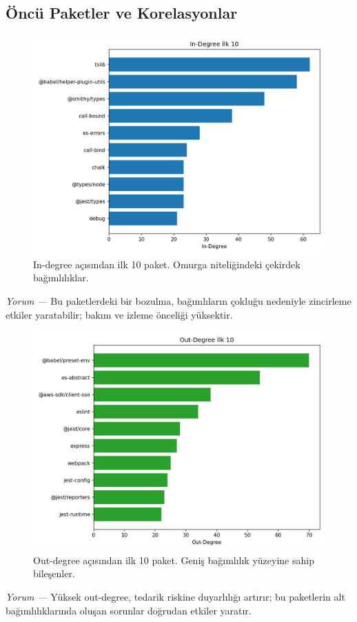 \documentclass[11pt,a4paper]{article}
\begin{document}
\subsection{Öncü Paketler ve Korelasyonlar}
\begin{figure}[H]
  \centering
  \includegraphics{top10_in_degree.png}
  \caption{In-degree açısından ilk 10 paket. Omurga niteliğindeki çekirdek bağımlılıklar.}
\end{figure}
\textit{Yorum —} Bu paketlerdeki bir bozulma, bağımlıların çokluğu nedeniyle zincirleme etkiler yaratabilir; bakım ve izleme önceliği yüksektir.

\begin{figure}[H]
  \centering
  \includegraphics{top10_out_degree.png}
  \caption{Out-degree açısından ilk 10 paket. Geniş bağımlılık yüzeyine sahip bileşenler.}
\end{figure}
\textit{Yorum —} Yüksek out-degree, tedarik riskine duyarlılığı artırır; bu paketlerin alt bağımlılıklarında oluşan sorunlar doğrudan etkiler yaratır.
\end{document}
